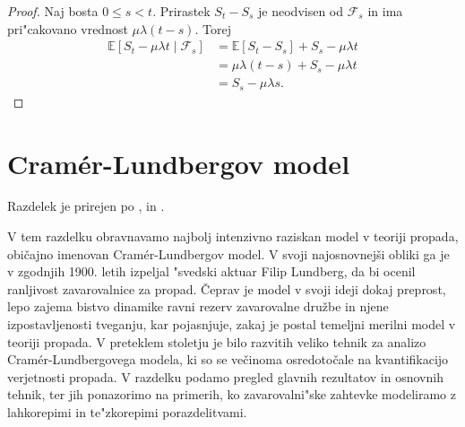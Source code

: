 \documentclass[12pt, a4paper, reqno]{amsart}
\theoremstyle{definition}
\theoremstyle{plain}
\newcommand{\R}{\mathbb{R}}
\newcommand{\E}{\mathbb{E}}
\newcommand{\F}{\mathcal{F}}
\newcommand{\1}{\mathds{1}}
\begin{document}
        \begin{proof}
            Naj bosta $0 \leq s < t$. Prirastek $S_t - S_s$ je neodvisen od $\F_s$ in ima 
            pri"cakovano vrednost $\mu\lambda(t-s)$. Torej 
            \begin{align*}
                \E\left[S_t - \mu\lambda t\mid\F_s\right] 
                        &= \E\left[S_t - S_s\right] + S_s - \mu\lambda t\\
                        &= \mu\lambda(t-s) + S_s - \mu\lambda t\\
                        &= S_s - \mu\lambda s.
            \end{align*}
        \end{proof}


\pagebreak

\section{Cramér-Lundbergov model}
    Razdelek je prirejen po \cite{3}, \cite{4} in  \cite{5}.

    V tem razdelku obravnavamo najbolj intenzivno raziskan model v teoriji propada, običajno imenovan 
    Cramér-Lundbergov model. V svoji najosnovnejši obliki 
    ga je v zgodnjih 1900. letih izpeljal "svedski aktuar Filip Lundberg, da bi ocenil ranljivost 
    zavarovalnice za propad. Čeprav je model v svoji ideji dokaj preprost, 
    lepo zajema bistvo dinamike ravni rezerv zavarovalne družbe in njene izpostavljenosti tveganju, 
    kar pojasnjuje, zakaj je postal temeljni merilni model v teoriji propada.
    V preteklem stoletju je bilo razvitih veliko tehnik za analizo Cramér-Lundbergovega modela, 
    ki so se večinoma osredotočale na kvantifikacijo verjetnosti propada. V razdelku podamo 
    pregled glavnih rezultatov in osnovnih tehnik, ter jih ponazorimo na primerih, ko 
    zavarovalni"ske zahtevke modeliramo z lahkorepimi in te"zkorepimi porazdelitvami.
\end{document}
